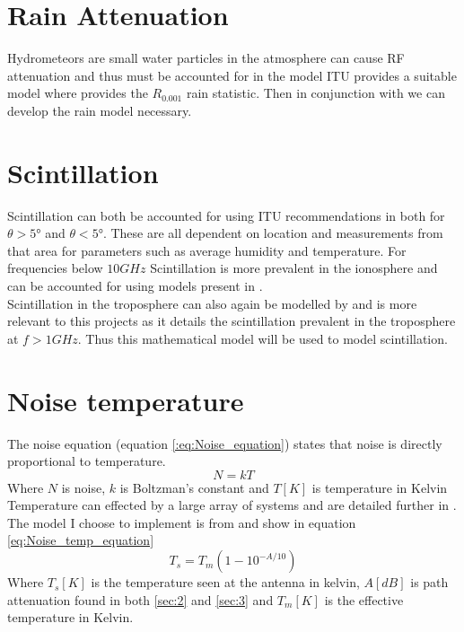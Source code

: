 \documentclass[conference]{IEEEtran}
\begin{document}
\label{sec:Atmosphere}

\section{Rain Attenuation}
Hydrometeors are small water particles in the atmosphere can cause RF attenuation and thus must be accounted for in the model ITU provides a suitable model where \cite{ITU-R_P.837-1} provides the $R_{0.001}$ rain statistic. Then in conjunction with \cite{ITU-R_P.618-7} we can develop the rain model necessary.\\

\label{sec:Rain}


\section{Scintillation}
Scintillation can both be accounted for using ITU recommendations in \cite{ITU-R_P.618-7} both for $\theta> 5°$ and $\theta < 5°$. These are all dependent on location and measurements from that area for parameters such as average humidity and temperature. For frequencies below $10G Hz$ Scintillation is more prevalent in the ionosphere and can be accounted for using models present in \cite{ITU-R_P.531-14}.\\ 

Scintillation in the troposphere can also again be modelled by \cite{ITU-R_P.618-7} and is more relevant to this projects as it details the scintillation prevalent in the troposphere at $f > 1G Hz$. Thus this mathematical model will be used to model scintillation.


\label{sec:Scintillation}

\section{Noise temperature}
The noise equation (equation \ref{:eq:Noise_equation}) states that noise is directly proportional to temperature. 
\begin{equation}
N = kT
\label{:eq:Noise_equation}
\end{equation}
Where $N$ is noise, $k$ is Boltzman's constant and $T[K]$ is temperature in Kelvin\\

Temperature can effected by a large array of systems and are detailed further in \cite{ITU-R_P.372-16}. The model I choose to implement is from \cite{ITU-R_P.618-7} and show in equation \ref{eq:Noise_temp_equation}
\begin{equation}
T_s = T_m(1-10^{-A/10})
\label{eq:Noise_temp_equation}
\end{equation}
Where $T_s[K]$ is the temperature seen at the antenna in kelvin, $A[dB]$ is path attenuation found in both \ref{sec:2} and \ref{sec:3} and $T_m [K]$ is the effective temperature in Kelvin.\\
\end{document}
